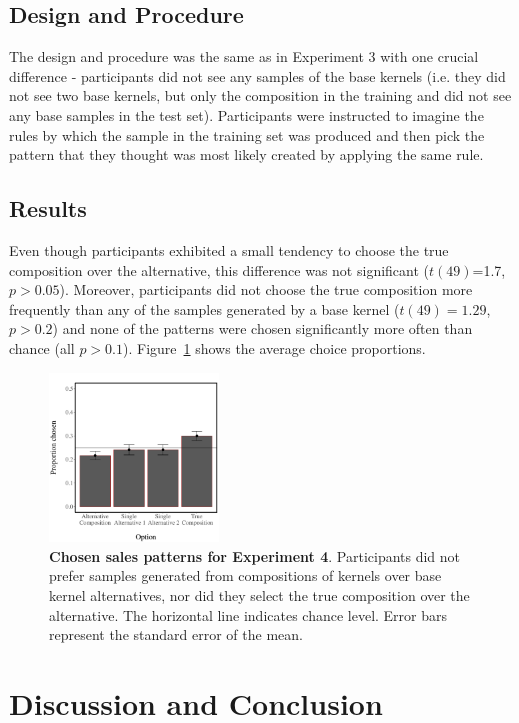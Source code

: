 \documentclass[10pt,letterpaper]{article}
\begin{document}
\subsection{Design and Procedure}
The design and procedure was the same as in Experiment 3 with one crucial difference - participants did not see any samples of the base kernels (i.e. they did not see two base kernels, but only the composition in the training and did not see any base samples in the test set). Participants were instructed to imagine the rules by which the sample in the training set was produced and then pick the pattern that they thought was most likely created by applying the same rule.

\subsection{Results}

Even though participants exhibited a small tendency to choose the true composition over the alternative, this difference was not significant ($t(49)$=1.7, $p>0.05$). Moreover, participants did not choose the true composition more frequently than any of the samples generated by a base kernel ($t(49)= 1.29$, $p>0.2$) and none of the patterns were chosen significantly more often than chance (all $p>0.1$).
Figure~\ref{fig:results4} shows the average choice proportions.
\begin{figure}[ht!]
\centering
\includegraphics[width=0.4\textwidth]{results4.pdf}
\caption{\textbf{Chosen sales patterns for Experiment 4}. Participants did not prefer samples generated from compositions of kernels over base kernel alternatives, nor did they select the true composition over the alternative. The horizontal line indicates chance level. Error bars represent the standard error of the mean.}
\label{fig:results4}
\end{figure}
 
 
\section{Discussion and Conclusion}
\end{document}
